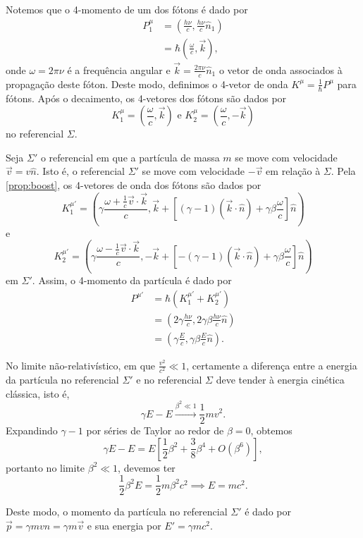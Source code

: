 \documentclass[12pt,a4paper]{article}
\numberwithin{equation}{section}
\begin{document}
Notemos que  o 4-momento de um dos fótons é dado por
\begin{align*}
    P_1^\mu &= \left(\frac{h \nu}{c}, \frac{h\nu}{c}\hat{n}_1\right)\\
            &= \hbar \left(\frac{\omega}{c}, \vec{k}\right),
\end{align*}
onde \(\omega = 2\pi \nu\) é a frequência angular e \(\vec{k} = \frac{2\pi \nu}{c}\hat{n}_1\) o vetor de onda associados à propagação deste fóton. Deste modo, definimos o 4-vetor de onda \(K^\mu = \frac{1}{\hbar} P^\mu\) para fótons. Após o decaimento, os 4-vetores dos fótons são dados por
\begin{equation*}
    K_1^\mu = \left(\frac{\omega}{c}, \vec{k}\right) \text{ e }K_2^\mu = \left(\frac{\omega}{c}, -\vec{k}\right)
\end{equation*}
no referencial \(\Sigma\).

Seja \(\Sigma'\) o referencial em que a partícula de massa \(m\) se move com velocidade \(\vec{v} = v \hat{n}\). Isto é, o referencial \(\Sigma'\) se move com velocidade \(-\vec{v}\) em relação à \(\Sigma\). Pela \cref{prop:boost}, os 4-vetores de onda dos fótons são dados por
\begin{equation*}
    K_1^{\mu'} = \left(\gamma\frac{\omega + \frac{1}{c} \vec{v} \cdot \vec{k}}{c}, \vec{k} + \left[(\gamma - 1)(\vec{k} \cdot \hat{n}) + \gamma \beta \frac{\omega}{c} \right] \hat{n}\right)
\end{equation*}
e
\begin{equation*}
    K_2^{\mu'} = \left(\gamma\frac{\omega - \frac{1}{c} \vec{v} \cdot \vec{k}}{c}, -\vec{k} + \left[-(\gamma - 1)(\vec{k} \cdot \hat{n}) + \gamma \beta \frac{\omega}{c} \right] \hat{n}\right)
\end{equation*}
em \(\Sigma'\). Assim, o 4-momento da partícula é dado por
\begin{align*}
    P^{\mu'} &= \hbar \left(K_1^{\mu'} + K_2^{\mu'}\right)\\
    &= \left(2\gamma\frac{h\nu}{c}, 2\gamma \beta \frac{h\nu}{c}\hat{n}\right)\\
    &= \left(\gamma \frac{E}{c}, \gamma \beta \frac{E}{c} \hat{n}\right).
\end{align*}

No limite não-relativístico, em que \(\frac{v^2}{c^2} \ll 1\), certamente a diferença entre a energia da partícula no referencial \(\Sigma'\) e no referencial \(\Sigma\) deve tender à energia cinética clássica, isto é,
\begin{equation*}
    \gamma E - E \xrightarrow{\beta^2 \ll 1} \frac12 mv^2.
\end{equation*}
Expandindo \(\gamma - 1\) por séries de Taylor ao redor de \(\beta = 0\), obtemos
\begin{equation*}
    \gamma E - E = E \left[\frac12 \beta^2 + \frac38\beta^4 + O(\beta^6)\right],
\end{equation*}
portanto no limite \(\beta^2 \ll 1\), devemos ter
\begin{equation*}
    \frac12 \beta^2 E = \frac12 m\beta^2c^2 \implies E = mc^2.
\end{equation*}

Deste modo, o momento da partícula no referencial \(\Sigma'\) é dado por \(\vec{p} = \gamma m v \hat{n} = \gamma m \vec{v}\) e sua energia por \(E' = \gamma m c^2\).
\end{document}
